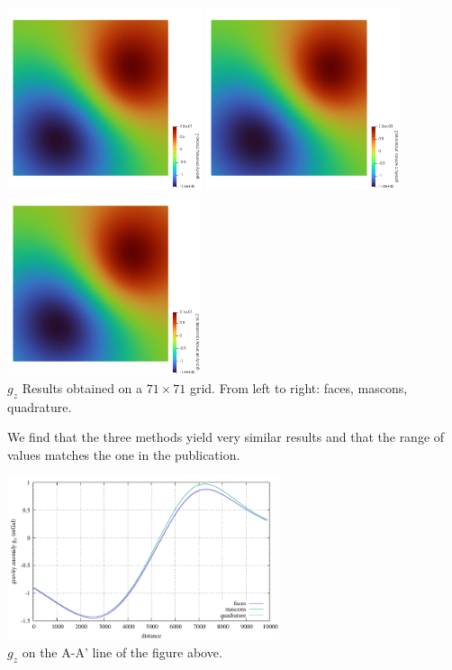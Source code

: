 \begin{center}
\includegraphics[width=5.7cm]{python_codes/fieldstone_113/results/hex_test3/g_faces}
\includegraphics[width=5.7cm]{python_codes/fieldstone_113/results/hex_test3/g_mascons}
\includegraphics[width=5.7cm]{python_codes/fieldstone_113/results/hex_test3/g_quadrature}\\
{\captionfont $g_z$ Results obtained on a $71\times71$ grid. From left to right: 
faces, mascons, quadrature.}
\end{center}

We find that the three methods yield very similar results and that the range
of values matches the one in the publication. 

\begin{center}
\includegraphics[width=8cm]{python_codes/fieldstone_113/results/hex_test3/line.pdf}\\
{\captionfont $g_z$ on the A-A' line of the figure above.}
\end{center}

